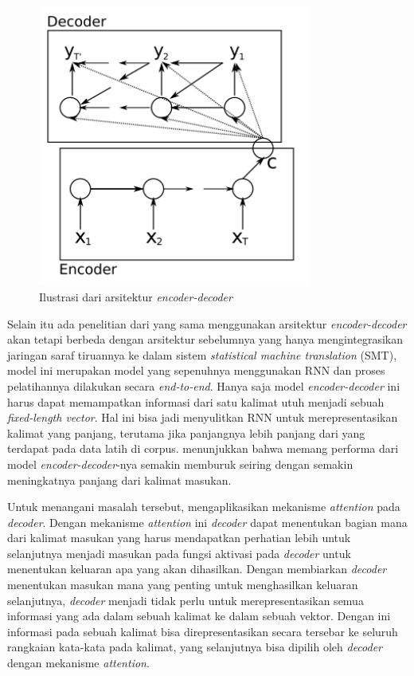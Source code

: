 \begin{figure}[h]
    \centering
    \includegraphics[width=0.8\textwidth]{resources/images/arsitektur-encoder-decoder.png}
    \caption{Ilustrasi dari arsitektur \textit{encoder-decoder} \parencite{Cho2014b}}
\end{figure}

Selain itu ada penelitian dari \textcite{Sutskever2014} yang sama menggunakan arsitektur \textit{encoder-decoder} akan tetapi berbeda dengan arsitektur sebelumnya yang hanya mengintegrasikan jaringan saraf tiruannya ke dalam sistem \textit{statistical machine translation} (SMT), model ini merupakan model yang sepenuhnya menggunakan RNN dan proses pelatihannya dilakukan secara \textit{end-to-end}. Hanya saja model \textit{encoder-decoder} ini harus dapat memampatkan informasi dari satu kalimat utuh menjadi sebuah \textit{fixed-length vector}. Hal ini bisa jadi menyulitkan RNN untuk merepresentasikan kalimat yang panjang, terutama jika panjangnya lebih panjang dari yang terdapat pada data latih di corpus. \textcite{Cho2014a} menunjukkan bahwa memang performa dari model \textit{encoder-decoder}-nya semakin memburuk seiring dengan semakin meningkatnya panjang dari kalimat masukan.
\bigskip

Untuk menangani masalah tersebut, \textcite{Bahdanau2015} mengaplikasikan mekanisme \textit{attention} pada \textit{decoder}. Dengan mekanisme \textit{attention} ini \textit{decoder} dapat menentukan bagian mana dari kalimat masukan yang harus mendapatkan perhatian lebih untuk selanjutnya menjadi masukan pada fungsi aktivasi pada \textit{decoder} untuk menentukan keluaran apa yang akan dihasilkan. Dengan membiarkan \textit{decoder} menentukan masukan mana yang penting untuk menghasilkan keluaran selanjutnya, \textit{decoder} menjadi tidak perlu untuk merepresentasikan semua informasi yang ada dalam sebuah kalimat ke dalam sebuah vektor. Dengan ini informasi pada sebuah kalimat bisa direpresentasikan secara tersebar ke seluruh rangkaian kata-kata pada kalimat, yang selanjutnya bisa dipilih oleh \textit{decoder} dengan mekanisme \textit{attention}.

